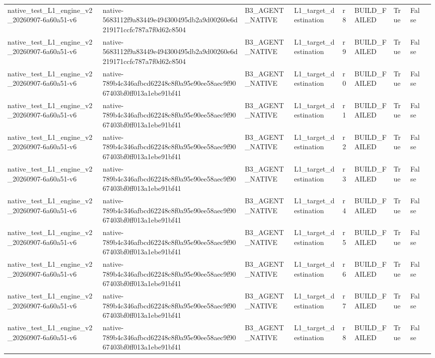 \begin{tabular}{lllllllll}
native\_test\_L1\_engine\_v2\_20260907-6a60a51-v6 & native-5683112f9a83449e494300495db2a9d00260e6d219171ccfc787a7f0d62c8504 & B3\_AGENT\_NATIVE & L1\_target\_destination & r8 & BUILD\_FAILED & True & False &  \\
native\_test\_L1\_engine\_v2\_20260907-6a60a51-v6 & native-5683112f9a83449e494300495db2a9d00260e6d219171ccfc787a7f0d62c8504 & B3\_AGENT\_NATIVE & L1\_target\_destination & r9 & BUILD\_FAILED & True & False &  \\
native\_test\_L1\_engine\_v2\_20260907-6a60a51-v6 & native-789b4c346afbcd62248c8f0a95e90ee58aec9f9067403bf0ff013a1ebe91bf41 & B3\_AGENT\_NATIVE & L1\_target\_destination & r0 & BUILD\_FAILED & True & False &  \\
native\_test\_L1\_engine\_v2\_20260907-6a60a51-v6 & native-789b4c346afbcd62248c8f0a95e90ee58aec9f9067403bf0ff013a1ebe91bf41 & B3\_AGENT\_NATIVE & L1\_target\_destination & r1 & BUILD\_FAILED & True & False &  \\
native\_test\_L1\_engine\_v2\_20260907-6a60a51-v6 & native-789b4c346afbcd62248c8f0a95e90ee58aec9f9067403bf0ff013a1ebe91bf41 & B3\_AGENT\_NATIVE & L1\_target\_destination & r2 & BUILD\_FAILED & True & False &  \\
native\_test\_L1\_engine\_v2\_20260907-6a60a51-v6 & native-789b4c346afbcd62248c8f0a95e90ee58aec9f9067403bf0ff013a1ebe91bf41 & B3\_AGENT\_NATIVE & L1\_target\_destination & r3 & BUILD\_FAILED & True & False &  \\
native\_test\_L1\_engine\_v2\_20260907-6a60a51-v6 & native-789b4c346afbcd62248c8f0a95e90ee58aec9f9067403bf0ff013a1ebe91bf41 & B3\_AGENT\_NATIVE & L1\_target\_destination & r4 & BUILD\_FAILED & True & False &  \\
native\_test\_L1\_engine\_v2\_20260907-6a60a51-v6 & native-789b4c346afbcd62248c8f0a95e90ee58aec9f9067403bf0ff013a1ebe91bf41 & B3\_AGENT\_NATIVE & L1\_target\_destination & r5 & BUILD\_FAILED & True & False &  \\
native\_test\_L1\_engine\_v2\_20260907-6a60a51-v6 & native-789b4c346afbcd62248c8f0a95e90ee58aec9f9067403bf0ff013a1ebe91bf41 & B3\_AGENT\_NATIVE & L1\_target\_destination & r6 & BUILD\_FAILED & True & False &  \\
native\_test\_L1\_engine\_v2\_20260907-6a60a51-v6 & native-789b4c346afbcd62248c8f0a95e90ee58aec9f9067403bf0ff013a1ebe91bf41 & B3\_AGENT\_NATIVE & L1\_target\_destination & r7 & BUILD\_FAILED & True & False &  \\
native\_test\_L1\_engine\_v2\_20260907-6a60a51-v6 & native-789b4c346afbcd62248c8f0a95e90ee58aec9f9067403bf0ff013a1ebe91bf41 & B3\_AGENT\_NATIVE & L1\_target\_destination & r8 & BUILD\_FAILED & True & False &  \\

\end{tabular}
